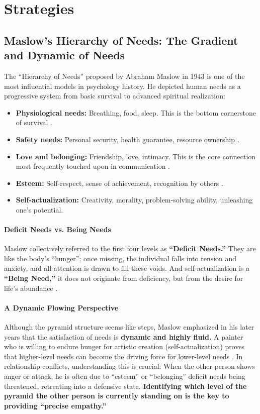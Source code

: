 \section{Strategies}

\subsection{Maslow's Hierarchy of Needs: The Gradient and Dynamic of Needs}

The ``Hierarchy of Needs'' proposed by Abraham Maslow in 1943 is one of
the most influential models in psychology history.
He depicted human needs as a progressive system from basic survival to
advanced spiritual realization:

\begin{itemize}
    \item \textbf{Physiological needs:} Breathing, food, sleep. This is
    the bottom cornerstone of survival \citep{damasio1994}.
    \item \textbf{Safety needs:} Personal security, health guarantee,
    resource ownership \citep{goleman1995}.
    \item \textbf{Love and belonging:} Friendship, love, intimacy.
    This is the core connection most frequently touched upon in communication \citep{ainsworth1978}.
    \item \textbf{Esteem:} Self-respect, sense of achievement, recognition
    by others \citep{erikson1950}.
    \item \textbf{Self-actualization:} Creativity, morality, problem-solving
    ability, unleashing one's potential.
\end{itemize}

\paragraph{Deficit Needs vs. Being Needs}
Maslow collectively referred to the first four levels as \textbf{``Deficit
Needs.''}
They are like the body's ``hunger''; once missing, the individual falls
into tension and anxiety, and all attention is drawn to fill these voids.
And self-actualization is a \textbf{``Being Need,''} it does not originate
from deficiency, but from the desire for life's abundance \citep{salovey1990}.

\paragraph{A Dynamic Flowing Perspective}
Although the pyramid structure seems like steps, Maslow emphasized in his
later years that the satisfaction of needs is \textbf{dynamic and highly
fluid.}
A painter who is willing to endure hunger for artistic creation
(self-actualization) proves that higher-level needs can become the driving
force for lower-level needs \citep{hoffman2000}.
In relationship conflicts, understanding this is crucial:
When the other person shows anger or attack, he is often due to ``esteem''
or ``belonging'' deficit needs being threatened, retreating into a defensive
state.
\textbf{Identifying which level of the pyramid the other person is currently
standing on is the key to providing ``precise empathy.''}

